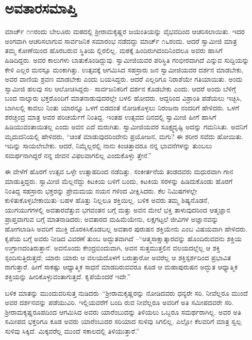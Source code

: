 
\chapter{ಅವತಾರಸಮಾಪ್ತಿ}

\noindent

ಮಾರ್ಚ್ ೧೧ರಂದು ಬೇಲೂರು ಮಠದಲ್ಲಿ ಶ್ರೀರಾಮಕೃಷ್ಣರ ಜಯಂತಿಯನ್ನು ವೈಭವದಿಂದ ಆಚರಿಸಲಾಯಿತು. ಇದರ ಅಂಗವಾಗಿ ಆಚರಿಸಲಾಗುವ ಸಾರ್ವಜನಿಕ ಸಮಾರಂಭ ನಡೆದದ್ದು ಮಾರ್ಚ್ ೧೬ರಂದು. ಆದರೆ ಸ್ವಾಮೀಜಿ ಮಾತ್ರ ತಮ್ಮ ಕೋಣೆಯಿಂದ ಹೊರಬರುವ ಸ್ಥಿತಿಯ ಲ್ಲಿರಲಿಲ್ಲ. ಮಠಕ್ಕೆ ಹಿಂದಿರುಗಿದಂದಿನಿಂದಲೂ ಅವರು ಹಾಸಿಗೆ ಹಿಡಿದಿದ್ದರು. ಅವರ ಕಾಲುಗಳು ಬಾತುಕೊಂಡಿದ್ದುವು. ಸ್ವಾಮೀಜಿಯವರ ಪರಿಸ್ಥಿತಿ ಗಂಭೀರವಾಗಿದೆ ಎನ್ನುವ ಸುದ್ದಿಯನ್ನು ಕೇಳಿ ಎಲ್ಲರ ಮನಸ್ಸೂ ಮಂಕಾಗಿತ್ತು. ಉತ್ಸವಕ್ಕೆ ಆಗಮಿಸಿದ ಸಹಸ್ರಾರು ಜನ ಸ್ವಾಮೀಜಿಯವರ ದರ್ಶನ ಮಾಡಬೇಕು, ಅವರ ವಾಣಿಯ ಶ್ರವಣ ಮಾಡಬೇಕು ಎಂದು ಬಯಸಿದ್ದರು. ಆದರೆ ಎಲ್ಲರಿಗೂ ನಿರಾಶೆಯೇ ಗತಿಯಾಯಿತು. ಅಂದು ಸ್ವಾಮೀಜಿ ಹಲವು ಸಲ ಆಲೋಚಿಸಿದ್ದರು– ಸಾರ್ವಜನಿಕರಿಗೆ ದರ್ಶನ ಕೊಡಬೇಕು ಎಂದು. ಆದರೆ ಅಂದು ಬೆಳಿಗ್ಗೆ ಬಂದ ನಾಲ್ಕಾರು ಭಕ್ತರೊಂದಿಗೆ ಮಾತನಾಡುವುದರಲ್ಲೇ ಬಳಲಿ ಹೋದರು. ಆದ್ದರಿಂದ ವಿಶ್ರಾಂತಿ ಪಡೆಯಲು ಇಚ್ಛಿಸಿ, ಬಾಗಿಲಲ್ಲಿ ಕಾವಲು ನಿಂತು ಯಾರನ್ನೂ ಒಳಗೆ ಬಿಡದಂತೆ ನೋಡಿಕೊಳ್ಳಲು ನಿರಂಜನಾ ನಂದರಿಗೆ ಹೇಳಿದರು. ಒಳಗೆ ಶರಚ್ಚಂದ್ರ ಮಾತ್ರ ಅವರ ಪರಿಚರ್ಯೆಗೆ ನಿಂತಿದ್ದ. ಇಂತಹ ಉತ್ಸವದ ದಿನದಲ್ಲಿ ಸ್ವಾಮೀಜಿ ಹೀಗೆ ಹಾಸಿಗೆ ಹಿಡಿಯುವಂತಾಯಿತಲ್ಲ ಎಂದು ಅವನ ಎದೆ ಮರುಗಿತು. ಸ್ವಾಮೀಜಿಯವರ ಸೂಕ್ಷ್ಮದೃಷ್ಟಿ ಅದನ್ನು ಗಮನಿಸಿತು. ಅವನಿಗೆ ಮೃದುದನಿಯಲ್ಲಿ ಹೇಳಿದರು, “ಚಿಂತೆ ಮಾಡುವುದರಿಂದೇನು ಪ್ರಯೋಜನ, ಮಗು? ಈ ಶರೀರ ಸವೆದು ಹೋಯಿತು. ಇದಿನ್ನು ಸಾಯಲೇಬೇಕು. ಆದರೆ, ನಿಮ್ಮೆಲ್ಲರಲ್ಲಿ ನಾನು ಕಿಂಚಿತ್ತಾದರೂ ನನ್ನ ಭಾವನೆಗಳನ್ನು ತುಂಬಲು ಸಮರ್ಥನಾಗಿದ್ದರೆ ನನ್ನ ಜೀವನ ವಿಫಲವಾಗಲಿಲ್ಲ ಎಂದುಕೊಳ್ಳು ತ್ತೇನೆ.”

ಈ ವೇಳೆಗೆ ಹೊರಗೆ ಉತ್ಸವ ಒಳ್ಳೇ ಉತ್ಸಾಹದಿಂದ ನಡೆದಿತ್ತು. ಸಂಕೀರ್ತನೆಯ ತಂಡದವರು ಮಧುರವಾಗಿ ಗಾನ ಮಾಡುತ್ತಿದ್ದರು. ಸ್ವಾಮೀಜಿ ಮೆಲ್ಲನೆದ್ದು ಕಿಟಕಿಯ ಬಳಿಗೆ ಬಂದು, ಕಿಟಕಿಯ ಸರಳನ್ನು ಹಿಡಿದುಕೊಂಡು ಹೊರಗೆ ನಿಂತಿದ್ದ ಸಹಸ್ರಾರು ಭಕ್ತರನ್ನು ಪ್ರೇಮಮಯ ನಯನ ಗಳಿಂದ ವೀಕ್ಷಿಸಿದರು. ಕೆಲ ನಿಮಿಷಗಳಲ್ಲೇ ಕುಳಿತುಕೊಳ್ಳಬೇಕಾಯಿತು–ಬಹಳ ಹೊತ್ತು ನಿಲ್ಲಲೂ ಶಕ್ತಿಯಿಲ್ಲ. ಬಳಿಕ ಅವರು ತಮ್ಮ ಶಿಷ್ಯನೊಡನೆ, ಯುಗಯುಗಗಳಲ್ಲಿ ಅವತಾರವೆತ್ತುವ ಭಗವಂತನ ಬಗ್ಗೆ ಮತ್ತು ಅವನ ಮೇಲೆ ಭಕ್ತಿ ತಾಳುವುದರಿಂದ ಆತ್ಮಜ್ಞಾನ ಪ್ರಾಪ್ತವಾಗುವ ಬಗ್ಗೆ ಮಾತನಾಡಿದರು; ಅವತಾರದ ಮಹಿಮೆಯೇನು, ಲಕ್ಷಗಟ್ಟಲೆ ಜೀವಿಗಳ ಅಜ್ಞಾನವನ್ನು ಹೋಗಲಾಡಿಸಿ ಅವರಿಗೆ ಮುಕ್ತಿ ದೊರಕಿಸಿಕೊಡಬಲ್ಲ ಅವತಾರ ಪುರುಷನ ಶಕ್ತಿಯೇನು ಎಂಬ ವಿಷಯವಾಗಿ ಹೇಳಿದರು. ಕೃಪೆಯ ಬಗ್ಗೆ ಅವರು ನೀಡಿದ ವಿವರಣೆ ತುಂಬ ಅದ್ಭುತವಾಗಿದೆ –“ಆತ್ಮಸಾಕ್ಷಾತ್ಕಾರವನ್ನು ಹೊಂದಿರುವವನು ಶಕ್ತಿಯ ಉಗ್ರಾಣದಂತಿರುತ್ತಾನೆ. ಅವನೊಂದು ಕೇಂದ್ರಬಿಂದುವಾಗಿ, ಅವನ ಸುತ್ತಮುತ್ತಲಿನ ವಲಯದಲ್ಲೆಲ್ಲ ಆ ಶಕ್ತಿ ಸ್ಪಂದಿಸುತ್ತಿರುತ್ತದೆ; ಯಾರು ಯಾರು ಆ ವಲಯದೊಳಗೆ ಬರುತ್ತಾರೋ ಅವರೆಲ್ಲ ಆ ಶಕ್ತಿಸ್ಪರ್ಶದಿಂದ ಪ್ರಭಾವಿತ ರಾಗುತ್ತಾರೆ. ಹೀಗೆ ಸಾಕಷ್ಟು ಆಧ್ಯಾತ್ಮಿಕ ಸಾಧನೆ ಮಾಡದಿರುವವರೂ ಕೂಡ ಆ ಮಹಾಪುರುಷನ ಅದ್ಭುತ ಆಧ್ಯಾತ್ಮಿಕ ಶಕ್ತಿಯನ್ನು ಹೀರಿಕೊಳ್ಳುವಂತಾಗುತ್ತದೆ. ಕೃಪೆಯೆಂದರೆ ಇದೇ.”

ಬಳಿಕ ಮಾತನ್ನು ಮುಂದುವರಿಸುತ್ತ ನುಡಿದರು–“ಶ್ರೀರಾಮಕೃಷ್ಣರನ್ನು ನೋಡಿದವರು ಧನ್ಯರೇ ಸರಿ. ನೀವೆಲ್ಲರೂ ಮುಂದೆ ಅವರ ದರ್ಶನವನ್ನು ಪಡೆಯುವಿರಿ. ಇಲ್ಲಿಯವರೆಗೆ ಬಂದಿ ರುವ ನೀವೆಲ್ಲರೂ ಅವರಿಗೆ ಅತಿ ಸಮೀಪದವರೇ ಸರಿ. ಶ್ರೀರಾಮಕೃಷ್ಣರೂಪದಿಂದ ಆಗಮಿಸಿದ ಅವರು ಯಾರೆಂಬುದನ್ನು ತಿಳಿಯಲು ಒಬ್ಬರೂ ಸಮರ್ಥರಾಗಿಲ್ಲ. ಅವರ ಅತಿ ಸಮೀಪದ ಭಕ್ತರಿಗೂ ಕೂಡ ಅವರು ಯಾರೆಂಬುದರ ಸರಿಯಾದ ಸುಳಿವು ಸಿಗಲಿಲ್ಲ. ಎಲ್ಲೋ ಕೆಲವರಿಗೆ ಮಾತ್ರ ಸ್ವಲ್ಪ ಸುಳಿವು ಸಿಕ್ಕಿದೆ. ಮಿಕ್ಕವರೆಲ್ಲ ಮುಂದೆ ಸಕಾಲದಲ್ಲಿ ತಿಳಿಯುತ್ತಾರೆ.”

